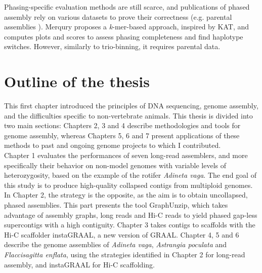 Phasing-specific evaluation methods are still scarce, and publications of phased assembly rely on various datasets to prove their correctness (e.g. parental assemblies \cite{phased_human}). Merqury \cite{merqury} proposes a \textit{k}-mer-based approach, inspired by KAT, and computes plots and scores to assess phasing completeness and find haplotype switches. However, similarly to trio-binning, it requires parental data. \\

\section{Outline of the thesis}

This first chapter introduced the principles of DNA sequencing, genome assembly, and the difficulties specific to non-vertebrate animals. This thesis is divided into two main sections: Chapters 2, 3 and 4 describe methodologies and tools for genome assembly, whereas Chapters 5, 6 and 7 present applications of these methods to past and ongoing genome projects to which I contributed. \\

Chapter 1 evaluates the performances of seven long-read assemblers, and more specifically their behavior on non-model genomes with variable levels of heterozygosity, based on the example of the rotifer \textit{Adineta vaga}. The end goal of this study is to produce high-quality collapsed contigs from multiploid genomes. In Chapter 2, the strategy is the opposite, as the aim is to obtain uncollapsed, phased assemblies. This part presents the tool GraphUnzip, which takes advantage of assembly graphs, long reads and Hi-C reads to yield phased gap-less supercontigs with a high contiguity. Chapter 3 takes contigs to scaffolds with the Hi-C scaffolder instaGRAAL, a new version of GRAAL. Chapter 4, 5 and 6 describe the genome assemblies of \textit{Adineta vaga}, \textit{Astrangia poculata} and \textit{Flaccisagitta enflata}, using the strategies identified in Chapter 2 for long-read assembly, and instaGRAAL for Hi-C scaffolding.  \\
